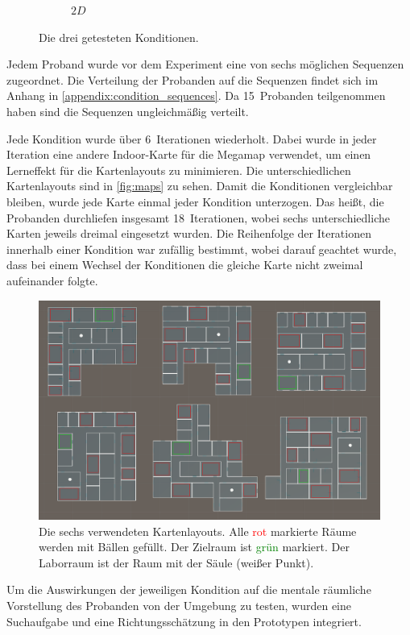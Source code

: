 \begin{figure}[h]
\begin{subfigure}{0.32\linewidth}
        \caption{$2D$}
    \end{subfigure}%
    \caption{Die drei getesteten Konditionen.}
    \label{fig:conditions}
\end{figure}
Jedem Proband wurde vor dem Experiment eine von sechs möglichen Sequenzen zugeordnet.
Die Verteilung der Probanden auf die Sequenzen findet sich im Anhang in \autoref{appendix:condition_sequences}.
Da 15~Probanden teilgenommen haben sind die Sequenzen ungleichmäßig verteilt.

Jede Kondition wurde über 6~Iterationen wiederholt.
Dabei wurde in jeder Iteration eine andere Indoor-Karte für die Megamap verwendet, um einen Lerneffekt für die Kartenlayouts zu minimieren.
Die unterschiedlichen Kartenlayouts sind in \autoref{fig:maps} zu sehen.
Damit die Konditionen vergleichbar bleiben, wurde jede Karte einmal jeder Kondition unterzogen.
Das heißt, die Probanden durchliefen insgesamt 18~Iterationen, wobei sechs unterschiedliche Karten jeweils dreimal eingesetzt wurden.
Die Reihenfolge der Iterationen innerhalb einer Kondition war zufällig bestimmt, wobei darauf geachtet wurde, dass bei einem Wechsel der Konditionen die gleiche Karte nicht zweimal aufeinander folgte.
\begin{figure}[h]
    \centering
    \includegraphics[width=0.75\linewidth]{figures/screenshots/maps_all}
    \caption{Die sechs verwendeten Kartenlayouts. %
    Alle \textcolor{red}{rot} markierte Räume werden mit Bällen gefüllt. %
    Der Zielraum ist \textcolor{green}{grün} markiert. %
    Der Laborraum ist der Raum mit der Säule (weißer Punkt).}
    \label{fig:maps}
\end{figure}

Um die Auswirkungen der jeweiligen Kondition auf die mentale räumliche Vorstellung des Probanden von der Umgebung zu testen, wurden eine Suchaufgabe und eine Richtungsschätzung in den Prototypen integriert.


